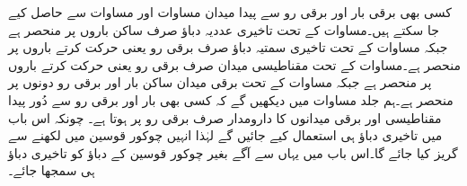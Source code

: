 کسی بھی برقی بار اور برقی رو سے پیدا میدان مساوات  اور مساوات  سے حاصل کیے جا سکتے ہیں۔مساوات  کے تحت تاخیری عددیہ دباؤ  صرف ساکن باروں پر منحصر ہے جبکہ مساوات  کے تحت  تاخیری سمتیہ دباؤ  صرف برقی رو یعنی حرکت کرتے باروں پر منحصر ہے۔مساوات  کے تحت مقناطیسی میدان  صرف برقی رو یعنی حرکت کرتے باروں پر منحصر ہے جبکہ مساوات  کے تحت برقی میدان  ساکن بار اور برقی رو دونوں پر منحصر ہے۔ہم جلد مساوات  میں دیکھیں گے کہ کسی بھی بار اور برقی رو سے  دُور پیدا مقناطیسی اور برقی میدانوں کا دارومدار صرف برقی رو پر ہوتا ہے۔ چونکہ اس باب میں تاخیری دباؤ ہی استعمال کیے جائیں گے لہٰذا انہیں چوکور قوسین میں لکھنے سے گریز کیا جائے گا۔اس باب میں یہاں سے آگے بغیر چوکور قوسین کے دباؤ کو تاخیری دباؤ ہی سمجھا جائے۔

